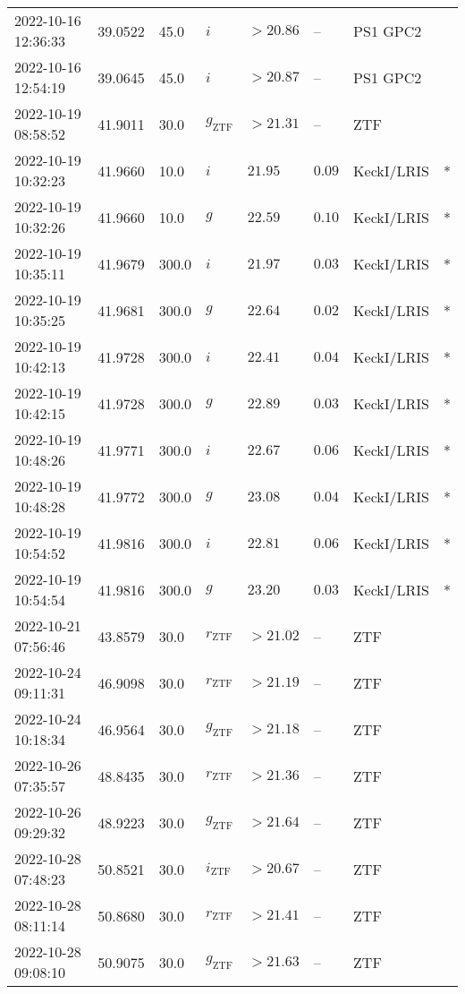 \documentclass{nature_plusfigure}
\begin{document}
\begin{supplement}
\begin{center}
\begin{longtable}{llllllll}
2022-10-16 12:36:33 & 39.0522 & 45.0 & $i$ & $>20.86$ & -- & PS1 GPC2 &  \\ 
2022-10-16 12:54:19 & 39.0645 & 45.0 & $i$ & $>20.87$ & -- & PS1 GPC2 &  \\ 
2022-10-19 08:58:52 & 41.9011 & 30.0 & ${g}_\mathrm{ZTF}$ & $>21.31$ & -- & ZTF &  \\ 
2022-10-19 10:32:23 & 41.9660 & 10.0 & $i$ & $21.95$ & $0.09$ & KeckI/LRIS & * \\ 
2022-10-19 10:32:26 & 41.9660 & 10.0 & $g$ & $22.59$ & $0.10$ & KeckI/LRIS & * \\ 
2022-10-19 10:35:11 & 41.9679 & 300.0 & $i$ & $21.97$ & $0.03$ & KeckI/LRIS & * \\ 
2022-10-19 10:35:25 & 41.9681 & 300.0 & $g$ & $22.64$ & $0.02$ & KeckI/LRIS & * \\ 
2022-10-19 10:42:13 & 41.9728 & 300.0 & $i$ & $22.41$ & $0.04$ & KeckI/LRIS & * \\ 
2022-10-19 10:42:15 & 41.9728 & 300.0 & $g$ & $22.89$ & $0.03$ & KeckI/LRIS & * \\ 
2022-10-19 10:48:26 & 41.9771 & 300.0 & $i$ & $22.67$ & $0.06$ & KeckI/LRIS & * \\ 
2022-10-19 10:48:28 & 41.9772 & 300.0 & $g$ & $23.08$ & $0.04$ & KeckI/LRIS & * \\ 
2022-10-19 10:54:52 & 41.9816 & 300.0 & $i$ & $22.81$ & $0.06$ & KeckI/LRIS & * \\ 
2022-10-19 10:54:54 & 41.9816 & 300.0 & $g$ & $23.20$ & $0.03$ & KeckI/LRIS & * \\ 
2022-10-21 07:56:46 & 43.8579 & 30.0 & ${r}_\mathrm{ZTF}$ & $>21.02$ & -- & ZTF &  \\ 
2022-10-24 09:11:31 & 46.9098 & 30.0 & ${r}_\mathrm{ZTF}$ & $>21.19$ & -- & ZTF &  \\ 
2022-10-24 10:18:34 & 46.9564 & 30.0 & ${g}_\mathrm{ZTF}$ & $>21.18$ & -- & ZTF &  \\ 
2022-10-26 07:35:57 & 48.8435 & 30.0 & ${r}_\mathrm{ZTF}$ & $>21.36$ & -- & ZTF &  \\ 
2022-10-26 09:29:32 & 48.9223 & 30.0 & ${g}_\mathrm{ZTF}$ & $>21.64$ & -- & ZTF &  \\ 
2022-10-28 07:48:23 & 50.8521 & 30.0 & ${i}_\mathrm{ZTF}$ & $>20.67$ & -- & ZTF &  \\ 
2022-10-28 08:11:14 & 50.8680 & 30.0 & ${r}_\mathrm{ZTF}$ & $>21.41$ & -- & ZTF &  \\ 
2022-10-28 09:08:10 & 50.9075 & 30.0 & ${g}_\mathrm{ZTF}$ & $>21.63$ & -- & ZTF &  \\ 

\end{longtable}
\end{center}
\end{supplement}
\end{document}
